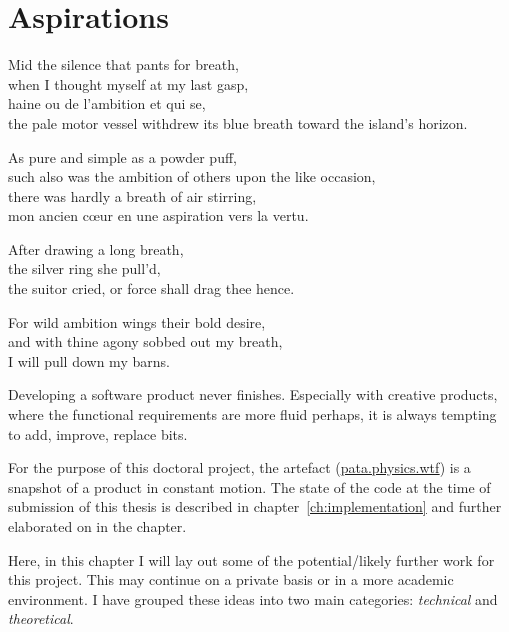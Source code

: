 
\chapter{Aspirations}
\label{ch:future}

\startcontents[chapters]

\vfill

Mid the silence that pants for breath, \\
when I thought myself at my last gasp, \\
haine ou de l'ambition et qui se, \\
the pale motor vessel withdrew its blue breath toward the island's horizon.

As pure and simple as a powder puff, \\
such also was the ambition of others upon the like occasion, \\
there was hardly a breath of air stirring, \\
mon ancien cœur en une aspiration vers la vertu.

After drawing a long breath, \\
the silver ring she pull'd, \\
the suitor cried, or force shall drag thee hence.

For wild ambition wings their bold desire, \\
and with thine agony sobbed out my breath, \\
I will pull down my barns.

\newpage
\minicontents
\spirals


Developing a software product never finishes. Especially with creative products, where the functional requirements are more fluid perhaps, it is always tempting to add, improve, replace bits. 

For the purpose of this doctoral project, the artefact (\url{pata.physics.wtf}) is a snapshot of a product in constant motion. The state of the code at the time of submission of this thesis is described in chapter~\ref{ch:implementation} and further elaborated on in the  chapter.

Here, in this chapter I will lay out some of the potential/likely further work for this project. This may continue on a private basis or in a more academic environment. I have grouped these ideas into two main categories: \emph{technical} and \emph{theoretical}. 


